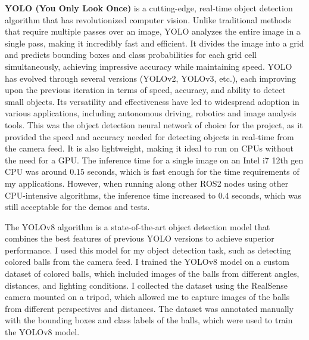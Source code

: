 \textbf{YOLO (You Only Look Once)} is a cutting-edge, real-time object detection algorithm 
that has revolutionized computer vision.
Unlike traditional methods that require multiple passes over an image, YOLO analyzes the entire image in a single pass,
making it incredibly fast and efficient. It divides the image into a grid and predicts bounding boxes and class probabilities
for each grid cell simultaneously, achieving impressive accuracy while maintaining speed. 
YOLO has evolved through several versions (YOLOv2, YOLOv3, etc.), each improving upon the previous iteration in terms of speed, 
accuracy, and ability to detect small objects. Its versatility and effectiveness have led to widespread adoption in various
applications, including autonomous driving, robotics and image analysis tools. This was the object detection neural
network of choice for the project, as it provided the speed and accuracy needed for detecting objects in real-time
from the camera feed. It is also lightweight, making it ideal to run on CPUs without the need for a GPU.
The inference time for a single image on an Intel i7 12th gen CPU was around $0.15$ seconds, which is fast enough
for the time requirements of my applications. However, when running along other ROS2 nodes using other CPU-intensive
algorithms, the inference time increased to $0.4$ seconds, which was still acceptable for the demos and tests.

The YOLOv8 algorithm is a state-of-the-art object detection model that combines the best features of previous YOLO versions
to achieve superior performance. I used this model for my object detection task, such as detecting colored balls
from the camera feed. I trained the YOLOv8 model on a custom dataset of colored balls, which included images of the balls
from different angles, distances, and lighting conditions. I collected the dataset using the RealSense camera mounted
on a tripod, which allowed me to capture images of the balls from different perspectives and distances. The dataset
was annotated manually with the bounding boxes and class labels of the balls, which were used to train the YOLOv8 model.

